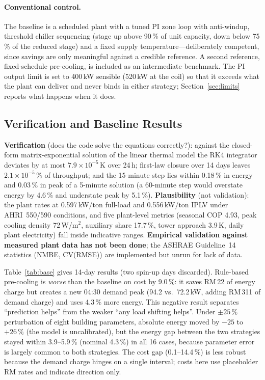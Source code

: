 \documentclass{svproc}
\begin{document}
\paragraph{Conventional control.} The baseline is a scheduled plant with a tuned PI zone loop with anti-windup, threshold chiller sequencing (stage up above 90\,\% of unit capacity, down below 75\,\% of the reduced stage) and a fixed supply temperature---deliberately competent, since savings are only meaningful against a credible reference. A second reference, fixed-schedule pre-cooling, is included as an intermediate benchmark. The PI output limit is set to 400\,kW sensible (520\,kW at the coil) so that it exceeds what the plant can deliver and never binds in either strategy; Section~\ref{sec:limits} reports what happens when it does.

\subsection{Verification and Baseline Results}
\textbf{Verification} (does the code solve the equations correctly?): against the closed-form matrix-exponential solution of the linear thermal model the RK4 integrator deviates by at most $7.9\times10^{-5}$\,K over 24\,h; first-law closure over 14 days leaves $2.1\times10^{-5}\,\%$ of throughput; and the 15-minute step lies within 0.18\,\% in energy and 0.03\,\% in peak of a 5-minute solution (a 60-minute step would overstate energy by 4.6\,\% and understate peak by 5.1\,\%). \textbf{Plausibility} (not validation): the plant rates at 0.597\,kW/ton full-load and 0.556\,kW/ton IPLV under AHRI~550/590 conditions, and five plant-level metrics (seasonal COP 4.93, peak cooling density 72\,W/m$^2$, auxiliary share 17.7\,\%, tower approach 3.9\,K, daily plant electricity) fall inside indicative ranges. \textbf{Empirical validation against measured plant data has not been done}; the ASHRAE Guideline~14 statistics \cite{ashrae14} (NMBE, CV(RMSE)) are implemented but unrun for lack of data.

Table~\ref{tab:base} gives 14-day results (two spin-up days discarded). Rule-based pre-cooling is \emph{worse} than the baseline on cost by 9.0\,\%: it saves RM\,22 of energy charge but creates a new 04:30 demand peak (94.2 vs.\ 72.2\,kW, adding RM\,311 of demand charge) and uses 4.3\,\% more energy. This negative result separates ``prediction helps'' from the weaker ``any load shifting helps''. Under $\pm25\,\%$ perturbation of eight building parameters, absolute energy moved by $-25$ to $+26\,\%$ (the model is uncalibrated), but the energy gap between the two strategies stayed within 3.9--5.9\,\% (nominal 4.3\,\%) in all 16 cases, because parameter error is largely common to both strategies. The cost gap (0.1--14.4\,\%) is less robust because the demand charge hinges on a single interval; costs here use placeholder RM rates and indicate direction only.
\end{document}
